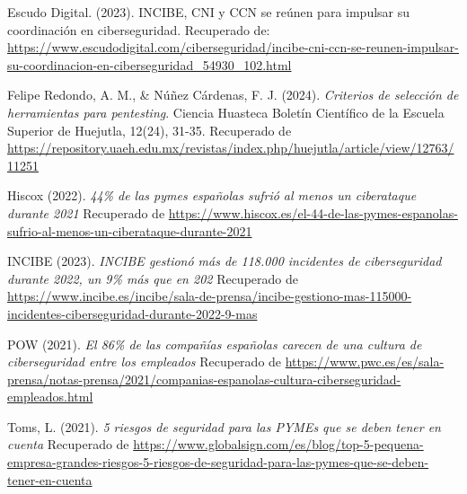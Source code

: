 \documentclass[a4paper, 10pt]{article}
\begin{document}
\begin{thebibliography}{20}
    Escudo Digital. (2023). INCIBE, CNI y CCN se reúnen para impulsar su coordinación en ciberseguridad. Recuperado de: \url{https://www.escudodigital.com/ciberseguridad/incibe-cni-ccn-se-reunen-impulsar-su-coordinacion-en-ciberseguridad_54930_102.html}

    Felipe Redondo, A. M., \& Núñez Cárdenas, F. J. (2024). \textit{Criterios de selección de herramientas para pentesting}. Ciencia Huasteca Boletín Científico de la Escuela Superior de Huejutla, 12(24), 31-35. Recuperado de \url{https://repository.uaeh.edu.mx/revistas/index.php/huejutla/article/view/12763/11251}
    
    Hiscox (2022). \textit{ 44\% de las pymes españolas sufrió al menos un ciberataque durante 2021} Recuperado de \url{https://www.hiscox.es/el-44-de-las-pymes-espanolas-sufrio-al-menos-un-ciberataque-durante-2021}

    INCIBE (2023). \textit{INCIBE gestionó más de 118.000 incidentes de ciberseguridad durante 2022, un 9\% más que en 202} Recuperado de \url{https://www.incibe.es/incibe/sala-de-prensa/incibe-gestiono-mas-115000-incidentes-ciberseguridad-durante-2022-9-mas}

    POW (2021). \textit{El 86\% de las compañías españolas carecen de una cultura de ciberseguridad entre los empleados} Recuperado de \url{https://www.pwc.es/es/sala-prensa/notas-prensa/2021/companias-espanolas-cultura-ciberseguridad-empleados.html}

    Toms, L. (2021). \textit{5 riesgos de seguridad para las PYMEs que se deben tener en cuenta} Recuperado de \url{https://www.globalsign.com/es/blog/top-5-pequena-empresa-grandes-riesgos-5-riesgos-de-seguridad-para-las-pymes-que-se-deben-tener-en-cuenta}
    
\end{thebibliography}


\clearpage
\end{document}
